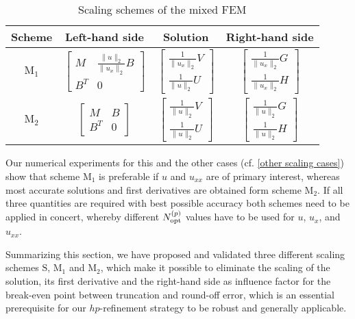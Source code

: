 \documentclass[final,3p]{elsarticle}
\begin{document}
\begin{table}[!ht]
\centering
\begin{tabular}{|c|c|c|c|}
\hline  
{Scheme}& Left-hand side & Solution & Right-hand side \\	%
\hline
$\text{M}_1$ & {$\left[ \begin{array}{cc} M & \frac{\|u\|_{2}}{\|u_{x}\|_{2}} B  \\ B^T & 0 \end{array}\right]$ } & $\left[ \begin{array}{cc} \frac{1}{\|u_x\|_{2}} {V} \\ \frac{1}{\|u\|_{2}} {U} \end{array}\right]$ & $\left[ \begin{array}{cc} \frac{1}{\|u_x\|_{2}} G \\ {\frac{1}{\|u_x\|_{2}} H} \end{array}\right]$\\	%
\hline
$\text{M}_2$ & {$\left[ \begin{array}{cc} M & B  \\ B^T & 0 \end{array}\right]$ } & $\left[ \begin{array}{cc} \frac{1}{\|u\|_{2}} {V} \\ \frac{1}{\|u\|_{2}} {U} \end{array}\right]$ & $\left[ \begin{array}{cc} \frac{1}{\|u\|_{2}} G \\ {\frac{1}{\|u\|_{2}} H} \end{array}\right]$ \\	%
\hline
\end{tabular}
\caption [sss] {Scaling schemes of the mixed FEM }
\label{Table: scaling schemes mix FEM}
\end{table}

Our numerical experiments for this and the other cases (cf. \ref{other scaling cases}) show that scheme $\text{M}_1$ is preferable if $u$ and $u_{xx}$ are of primary interest, whereas most accurate solutions and first derivatives are obtained form scheme $\text{M}_2$. If all three quantities are required with best possible accuracy both schemes need to be applied in concert, whereby different $N_{\rm opt}^{(p)}$ values have to be used for $u$, $u_x$, and $u_{xx}$.

Summarizing this section, we have proposed and validated three different scaling schemes $\text{S}$, $\text{M}_1$ and $\text{M}_2$, which make it possible to eliminate the scaling of the solution, its first derivative and the right-hand side as influence factor for the break-even point between truncation and round-off error, which is an essential prerequisite for our $hp$-refinement strategy to be robust and generally applicable.
\end{document}

